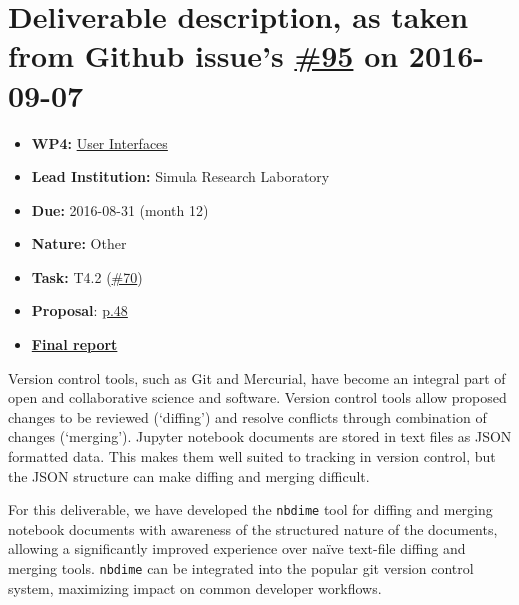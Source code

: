 \section*{\texorpdfstring{Deliverable description, as taken from Github
issue's
\href{https://github.com/OpenDreamKit/OpenDreamKit/issues/95}{\#95} on
2016-09-07}{Deliverable description, as taken from Github issue's \#95 on 2016-09-07}}\label{deliverable-description-as-taken-from-github-issues-95-on-2016-09-07}

\begin{itemize}
\tightlist
\item
  \textbf{WP4:}
  \href{https://github.com/OpenDreamKit/OpenDreamKit/tree/master/WP4}{User
  Interfaces}
\item
  \textbf{Lead Institution:} Simula Research Laboratory
\item
  \textbf{Due:} 2016-08-31 (month 12)
\item
  \textbf{Nature:} Other
\item
  \textbf{Task:} T4.2
  (\href{https://github.com/OpenDreamKit/OpenDreamKit/issues/70}{\#70})
\item
  \textbf{Proposal}:
  \href{https://github.com/OpenDreamKit/OpenDreamKit/raw/master/Proposal/proposal-www.pdf}{p.48}
\item
  \textbf{\href{https://github.com/OpenDreamKit/OpenDreamKit/raw/master/WP4/D4.6/report-final.pdf}{Final
  report}}
\end{itemize}

Version control tools, such as Git and Mercurial, have become an
integral part of open and collaborative science and software. Version
control tools allow proposed changes to be reviewed (`diffing') and
resolve conflicts through combination of changes (`merging'). Jupyter
notebook documents are stored in text files as JSON formatted data. This
makes them well suited to tracking in version control, but the JSON
structure can make diffing and merging difficult.

For this deliverable, we have developed the \texttt{nbdime} tool for
diffing and merging notebook documents with awareness of the structured
nature of the documents, allowing a significantly improved experience
over naïve text-file diffing and merging tools. \texttt{nbdime} can be
integrated into the popular git version control system, maximizing
impact on common developer workflows.
